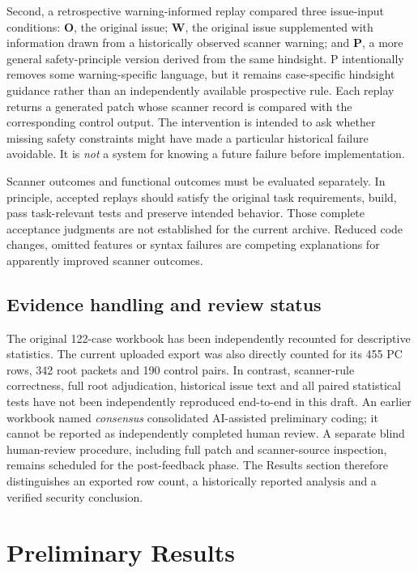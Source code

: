 \documentclass[journal,10pt,twoside]{IEEEtran}
\begin{document}
Second, a retrospective warning-informed replay compared three issue-input conditions: \textbf{O}, the original issue; \textbf{W}, the original issue supplemented with information drawn from a historically observed scanner warning; and \textbf{P}, a more general safety-principle version derived from the same hindsight. P intentionally removes some warning-specific language, but it remains case-specific hindsight guidance rather than an independently available prospective rule. Each replay returns a generated patch whose scanner record is compared with the corresponding control output. The intervention is intended to ask whether missing safety constraints might have made a particular historical failure avoidable. It is \emph{not} a system for knowing a future failure before implementation.

Scanner outcomes and functional outcomes must be evaluated separately. In principle, accepted replays should satisfy the original task requirements, build, pass task-relevant tests and preserve intended behavior. Those complete acceptance judgments are not established for the current archive. Reduced code changes, omitted features or syntax failures are competing explanations for apparently improved scanner outcomes.

\subsection{Evidence handling and review status}
The original 122-case workbook has been independently recounted for descriptive statistics. The current uploaded export was also directly counted for its 455 PC rows, 342 root packets and 190 control pairs. In contrast, scanner-rule correctness, full root adjudication, historical issue text and all paired statistical tests have not been independently reproduced end-to-end in this draft. An earlier workbook named \emph{consensus} consolidated AI-assisted preliminary coding; it cannot be reported as independently completed human review. A separate blind human-review procedure, including full patch and scanner-source inspection, remains scheduled for the post-feedback phase. The Results section therefore distinguishes an exported row count, a historically reported analysis and a verified security conclusion.

\section{Preliminary Results}
\end{document}
